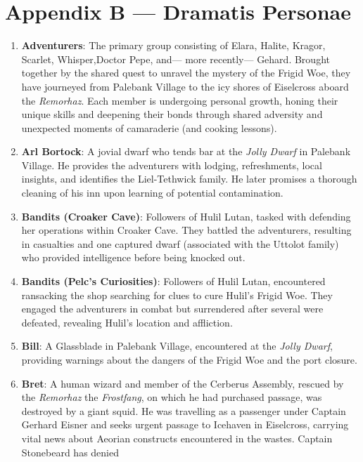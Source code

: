 \documentclass[
  letterpaper,12pt,twoside,twocolumn,openany,
  nodeprecatedcode,bg=full]{dndbook}
\begin{document}
\chapter{Appendix B --- Dramatis
Personae}\label{appendix-b-dramatis-personae}

\begin{enumerate}
\def\labelenumi{\arabic{enumi}.}
\item
  \textbf{Adventurers}: The primary group consisting of Elara, Halite,
  Kragor, Scarlet, Whisper,Doctor Pepe, and--- more recently--- Gehard.
  Brought together by the shared quest to unravel the mystery of the
  Frigid Woe, they have journeyed from Palebank Village to the icy
  shores of Eiselcross aboard the \emph{Remorhaz}. Each member is
  undergoing personal growth, honing their unique skills and deepening
  their bonds through shared adversity and unexpected moments of
  camaraderie (and cooking lessons).
\item
  \textbf{Arl Bortock}: A jovial dwarf who tends bar at the \emph{Jolly
  Dwarf} in Palebank Village. He provides the adventurers with lodging,
  refreshments, local insights, and identifies the Liel-Tethwick family.
  He later promises a thorough cleaning of his inn upon learning of
  potential contamination.
\item
  \textbf{Bandits (Croaker Cave)}: Followers of Hulil Lutan, tasked with
  defending her operations within Croaker Cave. They battled the
  adventurers, resulting in casualties and one captured dwarf
  (associated with the Uttolot family) who provided intelligence before
  being knocked out.
\item
  \textbf{Bandits (Pelc's Curiosities)}: Followers of Hulil Lutan,
  encountered ransacking the shop searching for clues to cure Hulil's
  Frigid Woe. They engaged the adventurers in combat but surrendered
  after several were defeated, revealing Hulil's location and
  affliction.
\item
  \textbf{Bill}: A Glassblade in Palebank Village, encountered at the
  \emph{Jolly Dwarf}, providing warnings about the dangers of the Frigid
  Woe and the port closure.
\item
  \textbf{Bret}: A human wizard and member of the Cerberus Assembly,
  rescued by the \emph{Remorhaz} the \emph{Frostfang}, on which he had
  purchased passage, was destroyed by a giant squid. He was travelling
  as a passenger under Captain Gerhard Eisner and seeks urgent passage
  to Icehaven in Eiselcross, carrying vital news about Aeorian
  constructs encountered in the wastes. Captain Stonebeard has denied

\end{enumerate}
\end{document}
